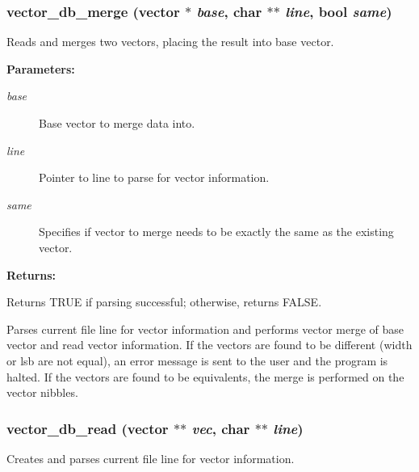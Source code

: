 \subsubsection{ vector\_\-db\_\-merge ({\bf vector} $\ast$ {\em base}, char $\ast$$\ast$ {\em line}, {\bf bool} {\em same})}\label{vector_8h_a5}


Reads and merges two vectors, placing the result into base vector.

\begin{Desc}
\item[{\bf Parameters: }]\par
\begin{description}
\item[
{\em base}]Base vector to merge data into. \item[
{\em line}]Pointer to line to parse for vector information. \item[
{\em same}]Specifies if vector to merge needs to be exactly the same as the existing vector.

\end{description}
\end{Desc}
\begin{Desc}
\item[{\bf Returns: }]\par
Returns TRUE if parsing successful; otherwise, returns FALSE.

\end{Desc}
Parses current file line for vector information and performs vector merge of  base vector and read vector information. If the vectors are found to be different (width or lsb are not equal), an error message is sent to the user and the program is halted. If the vectors are found to be equivalents, the merge is performed on the vector nibbles. 
\subsubsection{ vector\_\-db\_\-read ({\bf vector} $\ast$$\ast$ {\em vec}, char $\ast$$\ast$ {\em line})}\label{vector_8h_a4}


Creates and parses current file line for vector information.

